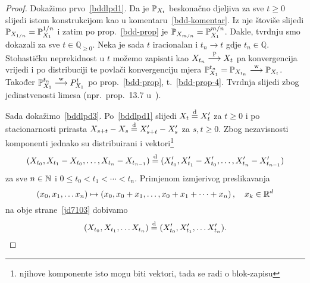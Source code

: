 \documentclass[main.tex]{subfiles}
\begin{document}
\begin{proof}
	Dokažimo prvo~\ref{bddlpd1}. Da je \( \P_{X_t} \) beskonačno djeljiva za sve \( t \geq 0 \) slijedi istom konstrukcijom kao u komentaru~\ref{bdd-komentar}. Iz nje štoviše slijedi
	\( \P_{X_{1/n}} = \P_{X_1}^{1/n} \) i zatim po prop.~\ref{bdd-prop} je  \( \P_{X_{m/n}} = \P_{X_1}^{m/n} \). Dakle, tvrdnju smo dokazali za sve \( t \in \mathbb Q_{\ge 0} \).
	Neka je sada \( t \) iracionalan i \( t_n \rightarrow t \) gdje \( t_n \in \mathbb Q \). Stohastičku neprekidnost u \( t \) možemo zapisati kao \( X_{t_n} \konvp X_{t} \) pa konvergencija vrijedi i po distribuciji
	te povlači konvergenciju mjera \( \P_{X_1}^{t_n} = \P_{X_{t_n}} \konvw \P_{X_t} \). Također \( \P_{X_1}^{t_n} \konvw P_{X_1}^t \) po prop.~\ref{bdd-prop}, t.~\ref{bdd-prop-4}. Tvrdnja slijedi zbog jedinstvenosti limesa (npr.\ prop.~13.7 u~\cite{sarapa}).

	Sada dokažimo~\ref{bddlpd3}. Po~\ref{bddlpd1} slijedi \( X_t \jpod X_t' \) za \( t \ge 0 \) i po stacionarnosti prirasta \( X_{s+t}-X_s \jpod X_{s+t}'-X_s' \) za \( s, t \ge 0 \). Zbog nezavisnosti komponenti jednako su distribuirani i vektori\footnote{njihove komponente isto mogu biti vektori, tada se radi o blok-zapisu}
	\begin{equation} \label{jd7103}
		( X_{t_0}, X_{t_1}-X_{t_0}, \ldots, X_{t_n}-X_{t_{n-1}}  )
		\jpod
		( X_{t_0}', X_{t_1}'-X_{t_0}', \ldots, X_{t_n}'-X_{t_{n-1}}'  )
	\end{equation}
	za sve \( n \in \N \) i \( 0 \le t_0 < t_1 < \cdots < t_n \). Primjenom
	izmjerivog preslikavanja
	\[
		\left( x_0, x_1, \ldots x_n \right) \mapsto \left( x_0, x_0 + x_1, \ldots, x_0 + x_1 + \cdots + x_n  \right), \quad x_k \in \R^d
	\]
	na obje strane~\eqref{jd7103} dobivamo
	\[
		( X_{t_0}, X_{t_1}, \ldots X_{t_n} )
		\jpod
		( X_{t_0}', X_{t_1}', \ldots X_{t_n}' ).
	\]


\end{proof}
\end{document}
